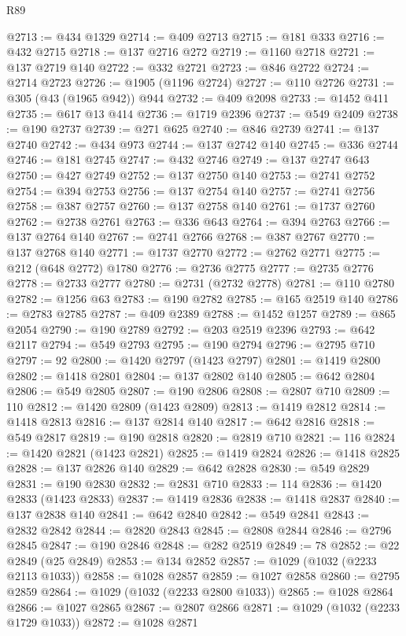 \begin{lexlean}{R89}
\begin{coremodule}
@2713 := @434 @1329
@2714 := @409 @2713
@2715 := @181 @333
@2716 := @432 @2715
@2718 := @137 @2716 @272
@2719 := @1160 @2718
@2721 := @137 @2719 @140
@2722 := @332 @2721
@2723 := @846 @2722
@2724 := @2714 @2723
@2726 := @1905 (@1196 @2724)
@2727 := @110 @2726
@2731 := @305 (@43 (@1965 @942)) @944
@2732 := @409 @2098
@2733 := @1452 @411
@2735 := @617 @13 @414
@2736 := @1719 @2396
@2737 := @549 @2409
@2738 := @190 @2737
@2739 := @271 @625
@2740 := @846 @2739
@2741 := @137 @2740
@2742 := @434 @973
@2744 := @137 @2742 @140
@2745 := @336 @2744
@2746 := @181 @2745
@2747 := @432 @2746
@2749 := @137 @2747 @643
@2750 := @427 @2749
@2752 := @137 @2750 @140
@2753 := @2741 @2752
@2754 := @394 @2753
@2756 := @137 @2754 @140
@2757 := @2741 @2756
@2758 := @387 @2757
@2760 := @137 @2758 @140
@2761 := @1737 @2760
@2762 := @2738 @2761
@2763 := @336 @643
@2764 := @394 @2763
@2766 := @137 @2764 @140
@2767 := @2741 @2766
@2768 := @387 @2767
@2770 := @137 @2768 @140
@2771 := @1737 @2770
@2772 := @2762 @2771
@2775 := @212 (@648 @2772) @1780
@2776 := @2736 @2775
@2777 := @2735 @2776
@2778 := @2733 @2777
@2780 := @2731 (@2732 @2778)
@2781 := @110 @2780
@2782 := @1256 @63
@2783 := @190 @2782
@2785 := @165 @2519 @140
@2786 := @2783 @2785
@2787 := @409 @2389
@2788 := @1452 @1257
@2789 := @865 @2054
@2790 := @190 @2789
@2792 := @203 @2519 @2396
@2793 := @642 @2117
@2794 := @549 @2793
@2795 := @190 @2794
@2796 := @2795 @710
@2797 := 92
@2800 := @1420 @2797 (@1423 @2797)
@2801 := @1419 @2800
@2802 := @1418 @2801
@2804 := @137 @2802 @140
@2805 := @642 @2804
@2806 := @549 @2805
@2807 := @190 @2806
@2808 := @2807 @710
@2809 := 110
@2812 := @1420 @2809 (@1423 @2809)
@2813 := @1419 @2812
@2814 := @1418 @2813
@2816 := @137 @2814 @140
@2817 := @642 @2816
@2818 := @549 @2817
@2819 := @190 @2818
@2820 := @2819 @710
@2821 := 116
@2824 := @1420 @2821 (@1423 @2821)
@2825 := @1419 @2824
@2826 := @1418 @2825
@2828 := @137 @2826 @140
@2829 := @642 @2828
@2830 := @549 @2829
@2831 := @190 @2830
@2832 := @2831 @710
@2833 := 114
@2836 := @1420 @2833 (@1423 @2833)
@2837 := @1419 @2836
@2838 := @1418 @2837
@2840 := @137 @2838 @140
@2841 := @642 @2840
@2842 := @549 @2841
@2843 := @2832 @2842
@2844 := @2820 @2843
@2845 := @2808 @2844
@2846 := @2796 @2845
@2847 := @190 @2846
@2848 := @282 @2519
@2849 := 78
@2852 := @22 @2849 (@25 @2849)
@2853 := @134 @2852
@2857 := @1029 (@1032 (@2233 @2113 @1033))
@2858 := @1028 @2857
@2859 := @1027 @2858
@2860 := @2795 @2859
@2864 := @1029 (@1032 (@2233 @2800 @1033))
@2865 := @1028 @2864
@2866 := @1027 @2865
@2867 := @2807 @2866
@2871 := @1029 (@1032 (@2233 @1729 @1033))
@2872 := @1028 @2871

\end{coremodule}
\end{lexlean}
